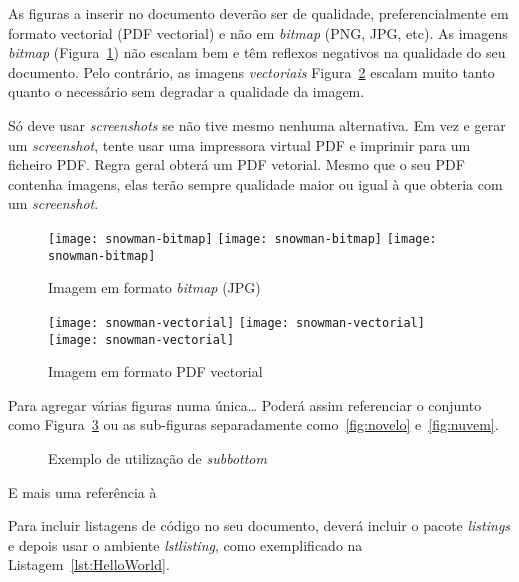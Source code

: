 As figuras a inserir no documento deverão ser de qualidade, preferencialmente em formato vectorial (PDF vectorial) e não em \emph{bitmap} (PNG, JPG, etc). As imagens \emph{bitmap} (Figura~\ref{fig:Figuras_Tree_silhouettes-bitmap}) não escalam bem e têm reflexos negativos na qualidade do seu documento.  Pelo contrário, as imagens \emph{vectoriais} {Figura~\ref{fig:Figuras_Tree_silhouettes-vectorial}} escalam muito tanto quanto o necessário sem degradar a qualidade da imagem.

Só deve usar \emph{screenshots} se não tive mesmo nenhuma alternativa.  Em vez e gerar um \emph{screenshot}, tente usar uma impressora virtual PDF e imprimir para um ficheiro PDF. Regra geral obterá um PDF vetorial. Mesmo que o seu PDF contenha imagens, elas terão sempre qualidade maior ou igual à que obteria com um \emph{screenshot}.


\begin{figure}[htbp]
	\centering
	\texttt{[image: snowman-bitmap]}
	\texttt{[image: snowman-bitmap]}
	\texttt{[image: snowman-bitmap]}
	\caption{Imagem em formato \emph{bitmap} (JPG)}
	\label{fig:Figuras_Tree_silhouettes-bitmap}
\end{figure}

\begin{figure}[htbp]
	\centering
	\texttt{[image: snowman-vectorial]}
	\texttt{[image: snowman-vectorial]}
	\texttt{[image: snowman-vectorial]}
	\caption{Imagem em formato PDF vectorial}
	\label{fig:Figuras_Tree_silhouettes-vectorial}
\end{figure}

Para agregar várias figuras numa única… Poderá assim referenciar o conjunto como Figura~\ref{fig:figura-completa} ou as sub-figuras separadamente como~\ref{fig:novelo} e~\ref{fig:nuvem}.


\begin{figure}[htbp]
	\centering
\qquad\qquad
  \caption{Exemplo de utilização de \emph{subbottom}}
  \label{fig:figura-completa}
\end{figure}

E mais uma referência à 

Para incluir listagens de código no seu documento, deverá incluir o pacote \emph{listings} e depois usar o ambiente \emph{lstlisting}, como exemplificado na Listagem~\ref{lst:HelloWorld}.

